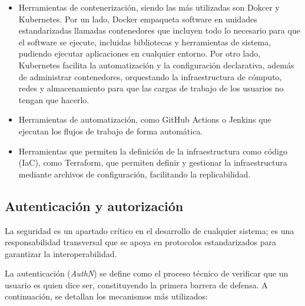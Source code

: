\begin{itemize}
    \item Herramientas de contenerización, siendo las más utilizadas son Dokcer y Kubernetes. Por un lado, Docker 
    \cite{docker} empaqueta software en unidades estandarizadas llamadas contenedores que incluyen todo lo necesario 
    para que el software se ejecute, incluidas bibliotecas y herramientas de sistema, pudiendo ejecutar aplicaciones 
    en cualquier entorno. Por otro lado, Kubernetes \cite{kubernetes} facilita la automatización y la configuración 
    declarativa, además de administrar contenedores, orquestando la infraestructura de cómputo, redes y almacenamiento 
    para que las cargas de trabajo de los usuarios no tengan que hacerlo.
    \item Herramientas de automatización, como GitHub Actions o Jenkins que ejecutan los flujos de trabajo de forma automática.
    \item Herramientas que permiten la definición de la infraestructura como código (IaC), como Terraform, que permiten 
    definir y gestionar la infraestructura mediante archivos de configuración, facilitando la replicabilidad.
\end{itemize}

\subsection{Autenticación y autorización}

La seguridad es un apartado crítico en el desarrollo de cualquier sistema; es una responsabilidad transversal que se 
apoya en protocolos estandarizados para garantizar la interoperabilidad.

La autenticación (\textit{AuthN}) se define como el proceso técnico de verificar que un usuario es quien dice ser, 
constituyendo la primera barrera de defensa. A continuación, se detallan los mecanismos más utilizados:

